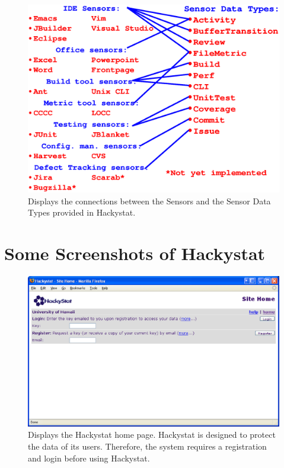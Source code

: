 \begin{figure}[h]
  \centering
  \includegraphics[width=1.00\textwidth]{figs/Sensors-DataTypes.eps}
  \caption[Hackystat Sensors and Sensor Data Types]{Displays the
    connections between the Sensors and the Sensor Data Types provided in
    Hackystat.} 
  \label{fig:hackystat-sensors-dataTypes}
\end{figure}


\section{Some Screenshots of Hackystat}
\begin{figure}[h]
  \centering
  \includegraphics[width=1.00\textwidth]{figs/UserInterface/page-home.eps}
  \caption[The Hackystat Home Page]{Displays the Hackystat home page. 
    Hackystat is designed to protect the data of its users. Therefore, the
    system requires a registration and login before using Hackystat.}
  \label{fig:page-home}
\end{figure}

